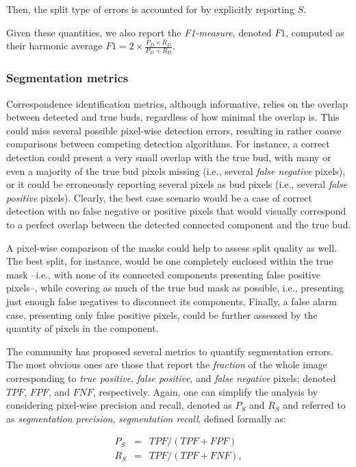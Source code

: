\documentclass[a4paper,authoryear,review]{elsarticle}
\begin{document}
	Then, the split type of errors is accounted for by explicitly reporting $S$. 
	
	Given these quantities, we also report the \emph{F1-measure}, denoted $F1$, computed as their harmonic average $F1 = 2 \times \frac{P_D \times R_D}{P_D + R_D}$.
	
	\subsubsection{Segmentation metrics}
	\label{subsec:segmetrics}
	
	Correspondence identification metrics, although informative, relies on the overlap between detected and true buds, regardless of how minimal the overlap is. This could miss several possible pixel-wise detection errors, resulting in rather coarse comparisons between competing detection algorithms. For instance, a correct detection could present a very small overlap with the true bud, with many or even a majority of the true bud pixels missing (i.e., several \emph{false negative} pixels), or it could be erroneously reporting several pixels as bud pixels (i.e., several \emph{false positive} pixels). Clearly, the best case scenario would be a case of correct detection with no false negative or positive pixels that would visually correspond to a perfect overlap between the detected connected component and the true bud. 
	
	A pixel-wise comparison of the masks could help to assess split quality as well. The best split, for instance, would be one completely enclosed within the true mask --i.e., with none of its connected components presenting false positive pixels--, while covering as much of the true bud mask as possible, i.e., presenting just enough false negatives to disconnect its components. Finally, a false alarm case, presenting only false positive pixels, could be further assessed by the quantity of pixels in the component. 
	
	The community has proposed several metrics to quantify segmentation errors. The most obvious ones are those that report the \emph{fraction} of the whole image corresponding to \emph{true positive}, \emph{false positive}, and \emph{false negative} pixels; denoted $TPF$, $FPF$, and $FNF$, respectively. Again, one can simplify the analysis by considering pixel-wise precision and recall, denoted as  $P_S$ and $R_S$ and referred to as \emph{segmentation precision}, \emph{segmentation recall}, defined formally as: 
	
	\begin{eqnarray*} 
		P_S &=& TPF / (TPF + FPF) \\
		R_S &=& TPF / (TPF + FNF),
	\end{eqnarray*}
	
\end{document}
